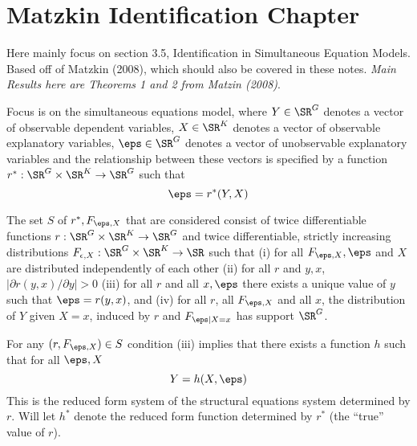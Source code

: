 
\section{Matzkin Identification Chapter}

Here mainly focus on section 3.5, Identification in Simultaneous Equation Models. Based off of Matzkin (2008), which should also be covered in these notes. \emph{Main Results here are Theorems 1 and 2 from Matzin (2008)}.

Focus is on the simultaneous equations model, where $Y \in \SR^G$ denotes a vector of observable dependent variables, $X \in \SR^K$ denotes a vector of observable explanatory variables, $\eps \in \SR^G$ denotes a vector of unobservable explanatory variables and the relationship between these vectors is specified by a function $r^*: \SR^G \times \SR^K \rightarrow \SR^G$ such that
\[\eps = r^*(Y,X)\]

The set $S$ of $r^*, F_{\eps,X}$ that are  considered consist of twice differentiable functions $r: \SR^G \times \SR^K \rightarrow \SR^G$ and twice differentiable, strictly increasing distributions $F_{\epsilon, X}: \SR^G \times \SR^K \rightarrow \SR$ such that (i) for all $F_{\eps, X}, \eps$ and $X$ are distributed independently of each other (ii) for all $r$ and $y,x$, $|\partial r(y,x)/ \partial y | > 0 $ (iii) for all $r$ and all $x,\eps$ there exists a unique value of $y$ such that $\eps = r(y,x)$, and (iv) for all $r$, all $F_{\eps, X}$ and all $x$, the distribution of $Y$ given $X = x$, induced by $r$ and $F_{\eps|X=x}$ has support $\SR^G$. 

For any $(r, F_{\eps, X}) \in S$ condition (iii) implies that there exists a function $h$ such that for all $\eps, X$ 
\[Y = h(X,\eps)\]
This is the reduced form system of the structural equations system determined by $r$. Will let $h^*$ denote the reduced form function determined by $r^*$ (the ``true'' value of $r$). 

